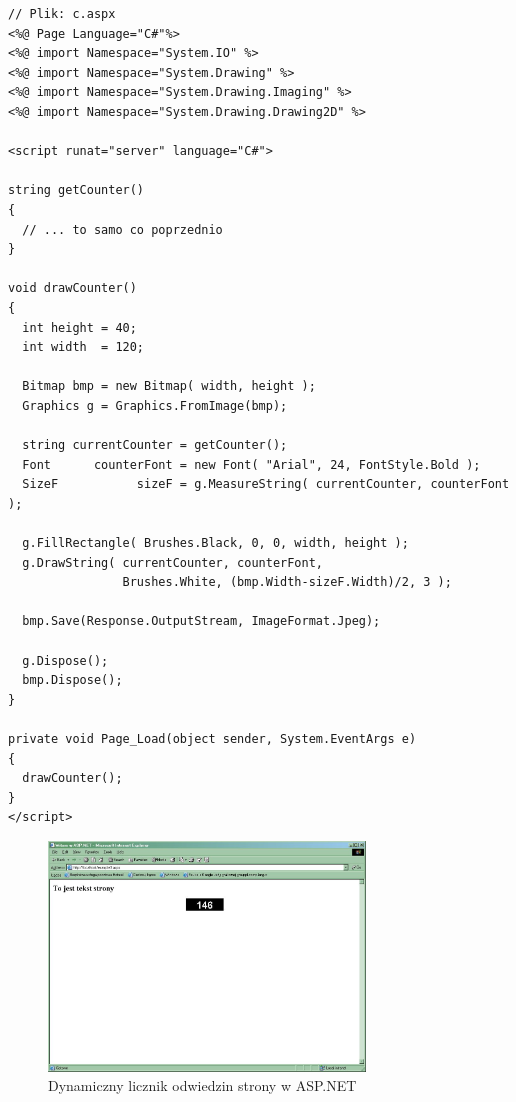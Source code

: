 \begin{scriptsize}
\begin{verbatim}
// Plik: c.aspx
<%@ Page Language="C#"%> 
<%@ import Namespace="System.IO" %> 
<%@ import Namespace="System.Drawing" %> 
<%@ import Namespace="System.Drawing.Imaging" %> 
<%@ import Namespace="System.Drawing.Drawing2D" %> 

<script runat="server" language="C#">

string getCounter()
{ 
  // ... to samo co poprzednio
} 

void drawCounter() 
{ 
  int height = 40; 
  int width  = 120; 

  Bitmap bmp = new Bitmap( width, height ); 
  Graphics g = Graphics.FromImage(bmp); 

  string currentCounter = getCounter(); 
  Font      counterFont = new Font( "Arial", 24, FontStyle.Bold ); 
  SizeF           sizeF = g.MeasureString( currentCounter, counterFont ); 

  g.FillRectangle( Brushes.Black, 0, 0, width, height ); 
  g.DrawString( currentCounter, counterFont, 
                Brushes.White, (bmp.Width-sizeF.Width)/2, 3 ); 

  bmp.Save(Response.OutputStream, ImageFormat.Jpeg); 

  g.Dispose(); 
  bmp.Dispose(); 
} 

private void Page_Load(object sender, System.EventArgs e)
{
  drawCounter();		
}
</script> 
\end{verbatim}
\end{scriptsize}

\begin{figure}
\begin{center}
\includegraphics[width=0.75\textwidth]{./pic/asp03}
\caption{Dynamiczny licznik odwiedzin strony w ASP.NET}
\end{center}
\end{figure}

